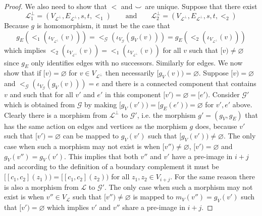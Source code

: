 \begin{proof}
    We also need to show that $<$ and ${\smile}$ are unique.
    Suppose that there exist
    \[
        \mathcal{L}^{\bot}_{1} = (V_{\mathcal{L}^{\bot}}, E_{\mathcal{L}^{\bot}}, s,t, <_{1})
    \qquad
    \text{and}
    \qquad
        \mathcal{L}^{\bot}_{2} = (V_{\mathcal{L}^{\bot}},E_{\mathcal{L}^{\bot}},s,t, <_{2})
    \]
    Because $g$ is homomorphism, it must be the case that 
    \[
        g_{E}(<_{1}(\iota_{V_{\mathcal{L}^{\bot}}}(v))) = <_{\mathcal{G}}(\iota_{V_{\mathcal{G}}}(g_{V}(v))) = g_{E}(<_{2}(\iota_{V_{\mathcal{L}^{\bot}}}(v)))
    \]
    which implies $<_{2}(\iota_{V_{\mathcal{L}^{\bot}}}(v)) = <_{1}(\iota_{V_{\mathcal{L}^{\bot}}}(v))$ for all $v$ such that $[v) \not = \varnothing$ since $g_{E}$ only identifies edges with no successors.
    Similarly for edges.
    We now show that if $[v) = \varnothing$ for $v \in V_{\mathcal{L}^{\bot}}$ then necessarily $[g_{V}(v)) = \varnothing$.
    Suppose $[v) = \varnothing$ and $<_{\mathcal{G}}(\iota_{V_{\mathcal{G}}}(g_{V}(v))) = e$ and there is a connected component that contains $v$ and such that for all $v'$ and $e'$ in this component $[v') = \varnothing = [e')$.
    Consider $\mathcal{G'}$ which is obtained from $\mathcal{G}$ by making $[g_{V}(v')) = [g_{E}(e')) = \varnothing$ for $v', e'$ above.
    Clearly there is a morphism from $\mathcal{L}^{\bot}$ to $\mathcal{G}'$, i.e. the morphism $g' = (g_{V},g_{E})$ that has the same action on edges and vertices as the morphism $g$ does, because $v'$ such that $[v') = \varnothing$ can be mapped to $g_{V}(v')$ such that $[g_{V}(v')) \not = \varnothing$.
    The only case when such a morphism may not exist is when $[v'') \not = \varnothing$, $[v') = \varnothing$ and $g_{V}(v'') = g_{V}(v')$.
    This implies that both $v''$ and $v'$ have a pre-image in $i + j$ and according to the definition of a boundary complement it must be $[[c_1,c_2](z_1)) = [[c_1,c_2](z_2))$ for all $z_1, z_2 \in V_{i + j}$.
    For the same reason there is also a morphism from $\mathcal{L}$ to $\mathcal{G}'$.
    The only case when such a morphism may not exist is when $v'' \in V_{\mathcal{L}}$ such that $[v'') \not = \varnothing$ is mapped to $m_{V}(v'') = g_{V}(v')$ such that $[v') = \varnothing$ which implies $v'$ and $v''$ share a pre-image in $i + j$.

\end{proof}
